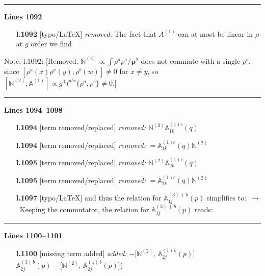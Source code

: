 \documentclass[10pt]{article}
\newenvironment{notebox}{\def\FrameCommand{{\color{notebar}\vrule width 1.5pt}\hspace{6pt}}\MakeFramed{\advance\hsize-\width\FrameRestore}\small}{\endMakeFramed}
\def\mf#1{\mathbb{#1}}
\def\v#1{\mathbf{#1}}
\begin{document}
\noindent\rule{\linewidth}{0.3pt}\par\noindent\textbf{Lines 1092}\par
\begin{itemize}[leftmargin=2.2em,itemsep=1pt,topsep=2pt]
\item[\textbf{l.1092}] \textsf{\small [typo/LaTeX]} \emph{removed:} The fact that $A^{(1)}$ can at most be linear in $\rho$ at $g$ order we find
\end{itemize}
\begin{notebox}\textsf{\small Note, l.1092:} [Removed: $\mf{N}^{(2)}\propto\int\rho^a\rho^a/\v{p}^2$ does not commute with a single $\rho^b$, since $[\rho^a(x)\rho^a(y),\rho^b(w)]\neq 0$ for $x\neq y$, so $[\mf{N}^{(2)},\mf{A}^{(1)}]\propto g^3 f^{abc}\{\rho^a,\rho^c\}\neq 0$.]\end{notebox}
\noindent\rule{\linewidth}{0.3pt}\par\noindent\textbf{Lines 1094--1098} \par
\begin{itemize}[leftmargin=2.2em,itemsep=1pt,topsep=2pt]
\item[\textbf{l.1094}] \textsf{\small [term removed/replaced]} \emph{removed:} $\displaystyle \mf {N}^{(2)}\mf{A}^{(1)c}_{1k}(q)$
\item[\textbf{l.1094}] \textsf{\small [term removed/replaced]} \emph{removed:} $\displaystyle = \mf{A}^{(1) c}_{1k}(q) \mf {N}^{(2)}$
\item[\textbf{l.1095}] \textsf{\small [term removed/replaced]} \emph{removed:} $\displaystyle \mf {N}^{(2)}\mf{A}^{(1)c}_{2k}(q)$
\item[\textbf{l.1095}] \textsf{\small [term removed/replaced]} \emph{removed:} $\displaystyle = \mf{A}^{(1) c}_{2k}(q) \mf {N}^{(2)}$
\item[\textbf{l.1097}] \textsf{\small [typo/LaTeX]} and thus 
the relation for $\mf{A}^{(3)\, \dagger\, b}_{1j}(p)$ simplifies to:\ $\longrightarrow$\ Keeping the commutator, the relation for $\mf{A}^{(3)\, \dagger\, b}_{1j}(p)$ reads:
\end{itemize}
\noindent\rule{\linewidth}{0.3pt}\par\noindent\textbf{Lines 1100--1101} \par
\begin{itemize}[leftmargin=2.2em,itemsep=1pt,topsep=2pt]
\item[\textbf{l.1100}] \textsf{\small [missing term added]} \emph{added:} $\displaystyle -\big[\mf{N}^{(2)},\,\mf{A}^{(1)\, b}_{2j}(p)\big]$$\displaystyle \mf{A}^{(3)\, b}_{2j}(p) -\big[\mf{N}^{(2)},\,\mf{A}^{(1)\, b}_{2j}(p)\big]${\color{gray}\small)}
\end{itemize}
\end{document}
